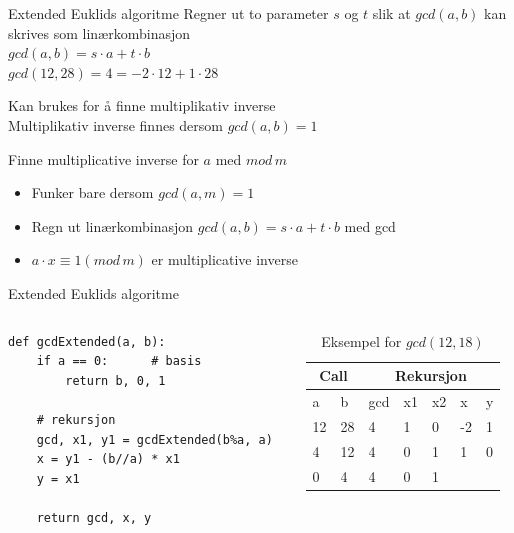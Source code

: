 \begin{frame}[fragile]{}
\begin{block}{Extended Euklids algoritme}
Regner ut to parameter $s$ og $t$ slik at $gcd(a,b)$ kan skrives som linærkombinasjon\\
$gcd(a,b)=s\cdot a+t\cdot b$\\
$gcd(12,28)=4=-2\cdot 12 + 1\cdot 28$\medskip

Kan brukes for å finne multiplikativ inverse\\
Multiplikativ inverse finnes dersom $gcd(a,b)=1$
\end{block}
\pause

\begin{block}{Finne multiplicative inverse for $a$ med $mod\, m$}
\begin{itemize}
\item Funker bare dersom $gcd(a,m)=1$\\
\item Regn ut linærkombinasjon $gcd(a,b)=s\cdot a+t\cdot b$ med gcd
\item $a\cdot x \equiv 1 (mod\, m)$ er multiplicative inverse
\end{itemize}
\end{block}
\end{frame}

\begin{frame}[fragile]{Extended Euklids algoritme}
\begin{columns}
    \begin{column}{0.58\textwidth}
\begin{verbatim}
def gcdExtended(a, b):
    if a == 0: 		# basis
    	return b, 0, 1
   
    # rekursjon
    gcd, x1, y1 = gcdExtended(b%a, a)
    x = y1 - (b//a) * x1
    y = x1
    
    return gcd, x, y
\end{verbatim}
 	\end{column}
 	\pause
    \begin{column}{0.38\textwidth}
\begin{table}
\begin{tabular}{l|l||l|l|l|l|l}
\multicolumn{2}{c||}{Call} & \multicolumn{5}{c}{Rekursjon}\\ \hline
a&b&gcd&x1&x2&x&y\\ \hline
12&28&4&1&0&-2&1\\
4&12&4&0&1&1&0\\
0&4&4&0&1&&
\end{tabular}
\caption{Eksempel for $gcd(12,18)$}
\end{table}
 	\end{column}
\end{columns}
\end{frame}

